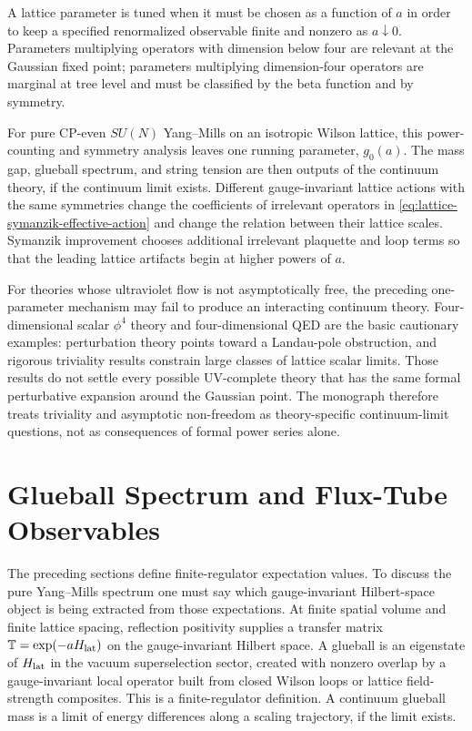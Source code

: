 \begin{definition}
A lattice parameter is tuned when it must be chosen as a function of \(a\) in
order to keep a specified renormalized observable finite and nonzero as
\(a\downarrow0\).  Parameters multiplying operators with dimension below four
are relevant at the Gaussian fixed point; parameters multiplying
dimension-four operators are marginal at tree level and must be classified by
the beta function and by symmetry.
\end{definition}

For pure CP-even \(SU(N)\) Yang--Mills on an isotropic Wilson lattice, this
power-counting and symmetry analysis leaves one running parameter, \(g_0(a)\).
The mass gap, glueball spectrum, and string tension are then outputs of the
continuum theory, if the continuum limit exists.  Different gauge-invariant
lattice actions with the same symmetries change the coefficients of irrelevant
operators in \eqref{eq:lattice-symanzik-effective-action} and change the
relation between their lattice scales.  Symanzik improvement chooses additional
irrelevant plaquette and loop terms so that the leading lattice artifacts begin
at higher powers of \(a\).

For theories whose ultraviolet flow is not asymptotically free, the preceding
one-parameter mechanism may fail to produce an interacting continuum theory.
Four-dimensional scalar \(\phi^4\) theory and four-dimensional QED are the
basic cautionary examples: perturbation theory points toward a Landau-pole
obstruction, and rigorous triviality results constrain large classes of
lattice scalar limits.  Those results do not settle every possible
UV-complete theory that has the same formal perturbative expansion around the
Gaussian point.  The monograph therefore treats triviality and asymptotic
non-freedom as theory-specific continuum-limit questions, not as consequences
of formal power series alone.

\section{Glueball Spectrum and Flux-Tube Observables}
\label{sec:lattice-ym-glueballs-flux-observables}

The preceding sections define finite-regulator expectation values.  To discuss
the pure Yang--Mills spectrum one must say which gauge-invariant Hilbert-space
object is being extracted from those expectations.  At finite spatial volume
and finite lattice spacing, reflection positivity supplies a transfer matrix
\(\mathbb T=\exp(-aH_{\rm lat})\) on the gauge-invariant Hilbert space.  A
glueball is an eigenstate of \(H_{\rm lat}\) in the vacuum superselection
sector, created with nonzero overlap by a gauge-invariant local operator built
from closed Wilson loops or lattice field-strength composites.  This is a
finite-regulator definition.  A continuum glueball mass is a limit of energy
differences along a scaling trajectory, if the limit exists.


